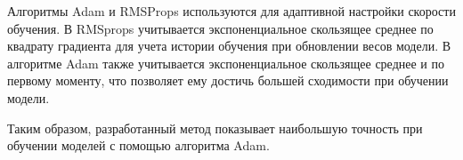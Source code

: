 Алгоритмы Adam и RMSProps используются для адаптивной настройки скорости обучения. В RMSprops учитывается экспоненциальное скользящее среднее по квадрату градиента для учета истории обучения при обновлении весов модели. В алгоритме Adam также учитывается экспоненциальное скользящее среднее и по первому моменту, что позволяет ему достичь большей сходимости при обучении модели.

Таким образом, разработанный метод показывает наибольшую точность при обучении моделей с помощью алгоритма Adam.

